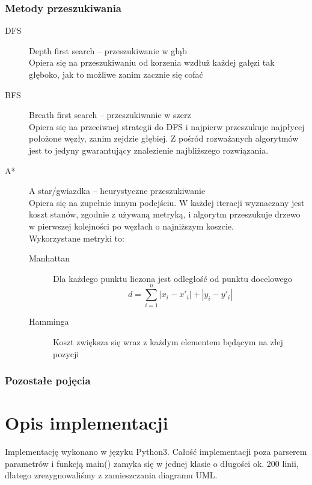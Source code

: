 \documentclass{classrep}
\begin{document}
\subsubsection{Metody przeszukiwania}
\begin{description}
    \item [DFS] Depth first search -- przeszukiwanie w głąb\\ 
    Opiera się na przeszukiwaniu od korzenia wzdłuż każdej gałęzi tak głęboko, jak to możliwe zanim zacznie się cofać
    \item [BFS] Breath first search -- przeszukiwanie w szerz\\
    Opiera się na przeciwnej strategii do DFS i najpierw przeszukuje najpłycej położone węzły, zanim zejdzie głębiej.
    Z pośród rozważanych algorytmów jest to jedyny gwarantujący znalezienie najbliższego rozwiązania.
    \item [A*]  A star/gwiazdka -- heurystyczne przeszukiwanie\\
    Opiera się na zupełnie innym podejściu.
    W każdej iteracji wyznaczany jest koszt stanów, zgodnie z używaną metryką, i algorytm przeszukuje drzewo w pierwszej kolejności po węzłach o najniższym koszcie.
    \\
    Wykorzystane metryki to:
    \begin{description}
        \item [Manhattan] Dla każdego punktu liczona jest odległość od punktu docelowego
        \[d=\sum_{i=1}^{n} |x_i-x'_i|+|y_i-y'_i|\] 
        \item [Hamminga] Koszt zwiększa się wraz z każdym elementem będącym na złej pozycji
    \end{description}
\end{description}

\subsubsection{Pozostałe pojęcia}
\begin{description}
    \item [Cykl]
    \item [Droga]
    \item 
\end{description}

\section{Opis implementacji}
Implementację wykonano w języku Python3. 
Całość implementacji poza parserem parametrów i funkcją main() zamyka się w jednej klasie o długości ok. 200 linii, dlatego zrezygnowaliśmy z zamieszczania diagramu UML.
\end{document}
